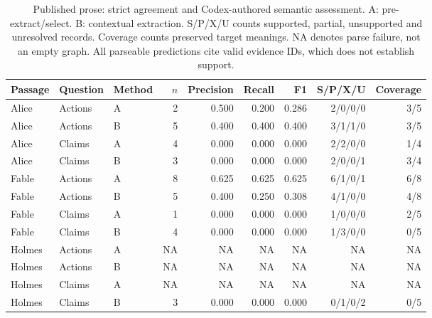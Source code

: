 \begin{table}[t]
\vspace*{6pt}
\caption{Published prose: strict agreement and Codex-authored semantic assessment. A: pre-extract/select. B: contextual extraction. S/P/X/U counts supported, partial, unsupported and unresolved records. Coverage counts preserved target meanings. NA denotes parse failure, not an empty graph. All parseable predictions cite valid evidence IDs, which does not establish support.}\label{tab:prose}
\centering\small\begin{tabular}{lllrrrrrr}\toprule
Passage & Question & Method & $n$ & Precision & Recall & F1 & S/P/X/U & Coverage\\\midrule
Alice & Actions & A & 2 & 0.500 & 0.200 & 0.286 & 2/0/0/0 & 3/5 \\
Alice & Actions & B & 5 & 0.400 & 0.400 & 0.400 & 3/1/1/0 & 3/5 \\
Alice & Claims & A & 4 & 0.000 & 0.000 & 0.000 & 2/2/0/0 & 1/4 \\
Alice & Claims & B & 3 & 0.000 & 0.000 & 0.000 & 2/0/0/1 & 3/4 \\
Fable & Actions & A & 8 & 0.625 & 0.625 & 0.625 & 6/1/0/1 & 6/8 \\
Fable & Actions & B & 5 & 0.400 & 0.250 & 0.308 & 4/1/0/0 & 4/8 \\
Fable & Claims & A & 1 & 0.000 & 0.000 & 0.000 & 1/0/0/0 & 2/5 \\
Fable & Claims & B & 4 & 0.000 & 0.000 & 0.000 & 1/3/0/0 & 0/5 \\
Holmes & Actions & A & NA & NA & NA & NA & NA & NA \\
Holmes & Actions & B & NA & NA & NA & NA & NA & NA \\
Holmes & Claims & A & NA & NA & NA & NA & NA & NA \\
Holmes & Claims & B & 3 & 0.000 & 0.000 & 0.000 & 0/1/0/2 & 0/5 \\\bottomrule\end{tabular}\end{table}
